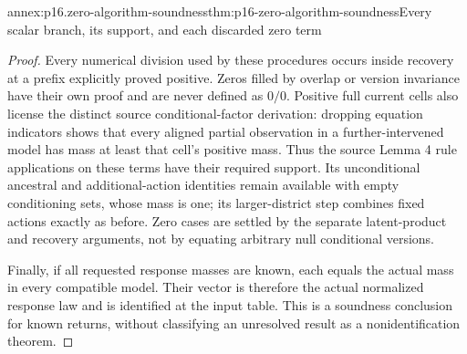 \begin{annexitem}{annex:p16.zero-algorithm-soundness}{thm:p16-zero-algorithm-soundness}{Every scalar branch, its support, and each discarded zero term}
\begin{proof}
Every numerical division used by these procedures occurs inside
recovery at a prefix explicitly proved positive. Zeros filled
by overlap or version invariance have their own proof and are
never defined as \(0/0\). Positive full current cells also
license the distinct source conditional-factor derivation: dropping
equation indicators shows that every aligned partial observation
in a further-intervened model has mass at least that cell's
positive mass. Thus the source Lemma 4 rule applications on
these terms have their required support. Its unconditional
ancestral and additional-action identities remain available with
empty conditioning sets, whose mass is one; its larger-district
step combines fixed actions exactly as before. Zero cases are
settled by the separate latent-product and recovery arguments,
not by equating arbitrary null conditional versions.

Finally, if all requested response masses are known, each equals
the actual mass in every compatible model. Their vector is therefore
the actual normalized response law and is identified at the input
table. This is a soundness conclusion for known returns, without
classifying an unresolved result as a nonidentification theorem.
\end{proof}
\end{annexitem}

